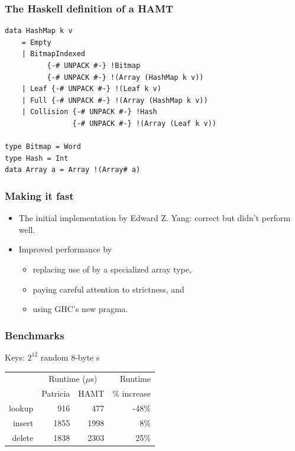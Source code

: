 \documentclass[xetex,mathserif,serif]{beamer}
\newcommand{\code}[1]{\mbox{\texttt{\small{\color{CodeColor}{#1}}}}}
\begin{document}
\begin{frame}[fragile]
  \frametitle{The Haskell definition of a HAMT}
  \begin{lstlisting}
data HashMap k v
    = Empty
    | BitmapIndexed
          {-# UNPACK #-} !Bitmap
          {-# UNPACK #-} !(Array (HashMap k v))
    | Leaf {-# UNPACK #-} !(Leaf k v)
    | Full {-# UNPACK #-} !(Array (HashMap k v))
    | Collision {-# UNPACK #-} !Hash
                {-# UNPACK #-} !(Array (Leaf k v))

type Bitmap = Word
type Hash = Int
data Array a = Array !(Array# a)
  \end{lstlisting}
\end{frame}

\begin{frame}
  \frametitle{Making it fast}
  \begin{itemize}
  \item The initial implementation by Edward Z. Yang: correct but
    didn't perform well.
    \item Improved performance by
      \begin{itemize}
        \item replacing use of \code{Data.Vector} by a
          specialized array type,
        \item paying careful attention to strictness, and
        \item using GHC's new \code{INLINABLE} pragma.
      \end{itemize}
  \end{itemize}
\end{frame}

\begin{frame}
  \frametitle{Benchmarks}

  Keys: $2^{12}$ random 8-byte \code{ByteString}s

  \bigskip
  \begin{center}
  \begin{tabular}{r|rrr}
                  & \multicolumn{2}{c}{Runtime ($\mu$s)} & Runtime \\
                  & Patricia & HAMT                      & \% increase \\
    \hline lookup &  916 &  477 & -48\% \\
           insert & 1855 & 1998 & 8\% \\
           delete & 1838 & 2303 & 25\% \\
  \end{tabular}
  \end{center}
\end{frame}
\end{document}

